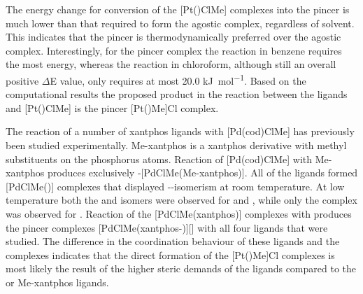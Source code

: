 The energy change for conversion of the [Pt(\tBuxantphos)ClMe] complexes into the pincer is much lower than that required to form the agostic complex, regardless of solvent.  This indicates that the pincer is thermodynamically preferred over the agostic complex.  Interestingly, for the pincer complex the reaction in benzene requires the most energy, whereas the reaction in chloroform, although still an overall positive $\Delta$E value, only requires at most 20.0 \si{\kilo\joule\per\mole}.  Based on the computational results the proposed product in the reaction between the \tBuxantphos{} ligands and [Pt()ClMe] is the pincer [Pt(\tBuxantphosk)Me]Cl complex.

The reaction of a number of xantphos ligands with [Pd(cod)ClMe] has previously been studied experimentally.\cite{Zuideveld2002}  Me-xantphos is a xantphos derivative with methyl substituents on the phosphorus atoms.  Reaction of [Pd(cod)ClMe] with Me-xantphos produces exclusively \cis{}-[PdClMe(Me-xantphos)].  All of the \Phxantphos{} ligands formed [PdClMe(\Phxantphos)] complexes that displayed \cis{}-\trans{}-isomerism at room temperature.  At low temperature both the \cis{} and \trans{} isomers were observed for \Phthixantphos{} and \Phxantphos{}, while only the \cis{} complex was observed for \Phxantphos{}.  Reaction of the [PdClMe(xantphos)] complexes with  produces the pincer complexes [PdClMe(xantphos-\POP{})][] with all four ligands that were studied.  The difference in the coordination behaviour of these ligands and the \tBuxantphos{} complexes indicates that the direct formation of the [Pt(\tBuxantphos)Me]Cl complexes is most likely the result of the higher steric demands of the \tBuxantphos{} ligands compared to the \Phxantphos{} or Me-xantphos ligands.


